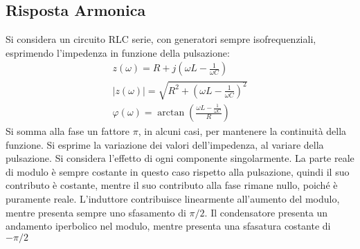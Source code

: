 \documentclass{article}
\numberwithin{equation}{subsection}
\begin{document}
\subsection{Risposta Armonica}

Si considera un circuito RLC serie, con generatori sempre isofrequenziali, esprimendo l'impedenza in funzione della pulsazione:
\begin{gather*}
    z(\omega)=R+j\displaystyle\left(\omega L-\frac{1}{\omega C}\right)\\
    |z(\omega)|=\displaystyle\sqrt{R^2+\left(\omega L-\frac{1}{\omega C}\right)^2}\\
    \varphi(\omega)=\arctan\left(\displaystyle\frac{\displaystyle\omega L-\frac{1}{\omega C}}{R}\right)
\end{gather*}
Si somma alla fase un fattore $\pi$, in alcuni casi, per mantenere la continuità della funzione. Si esprime la variazione dei valori dell'impedenza, al variare della 
pulsazione. Si considera l'effetto di ogni componente singolarmente. La parte reale di modulo è sempre costante in questo caso rispetto alla pulsazione, quindi il suo 
contributo è costante, mentre il suo contributo alla fase rimane nullo, poiché è puramente reale. L'induttore contribuisce linearmente all'aumento del modulo, mentre presenta 
sempre uno sfasamento di $\pi/2$. Il condensatore presenta un andamento iperbolico nel modulo, mentre presenta una sfasatura costante di $-\pi/2$
\begin{center}
\end{center}
\end{document}
